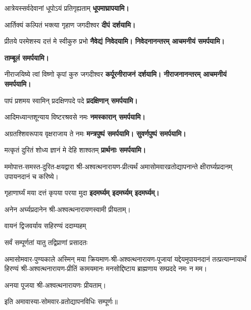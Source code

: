 \begin{center}

{आत्रेयस्सर्वदेवानां धूपोऽयं प्रतिगृह्यताम्}
\textbf{\devAya{} धूपमाघ्रापयामि।}
\medskip

{आर्तिक्यं कल्पितं भक्त्या गृहाण जगदीश्वर}
\textbf{\devAya{} दीपं दर्शयामि।}
\medskip

{प्रीतये परमेशस्य दत्तं मे स्वीकुरु प्रभो}
\textbf{\devAya{} नैवेद्यं निवेदयामि। निवेदनानन्तरम् आचमनीयं समर्पयामि।}
\medskip

\textbf{\devAya{} ताम्बूलं समर्पयामि।}
\medskip

{नीराजयिष्ये त्वां विष्णो कृपां कुरु जगदीश्वर}
\textbf{\devAya{} कर्पूरनीराजनं दर्शयामि। नीराजनानन्तरम् आचमनीयं समर्पयामि।}
\medskip

{पापं प्रशमय स्वामिन् प्रदक्षिणपदे पदे}
\textbf{\devAya{} प्रदक्षिणान् समर्पयामि।}
\medskip

{आदिमध्यान्तशून्याय विष्टरश्रवसे नमः}
\textbf{\devAya{} नमस्कारान् समर्पयामि।}
\medskip

{अग्रतश्शिवरूपाय वृक्षराजाय ते नमः}
\textbf{\devAya{} मन्त्रपुष्पं समर्पयामि। सुवर्णपुष्पं समर्पयामि।}
\medskip

{मत्कृतं दुरितं शोध्य ज्ञानं मे देहि शाश्वतम्}
\textbf{प्रार्थनाः समर्पयामि।}
\medskip

\resetShloka
ममोपात्त-समस्त-दुरित-क्षयद्वारा श्री-अश्वत्थनारायण-प्रीत्यर्थं
अमासोमवारव्रतोद्यापनान्ते क्षीरार्घ्यप्रदानम् उपायनदानं च करिष्ये।

{गृहाणार्घ्यं मया दत्तं कृपया परया मुदा}
\textbf{\devAya{} इदमर्घ्यम् इदमर्घ्यम् इदमर्घ्यम्।}

अनेन अर्घ्यप्रदानेन श्री-अश्वत्थनारायणस्वामी प्रीयताम्।


{वायनं द्विजवर्याय सहिरण्यं ददाम्यहम्}

{सर्वं सम्पूर्णतां यातु तद्विप्राणां प्रसादतः}

\hiranyagarbha

अमासोमवार-पुण्यकाले अस्मिन् मया क्रियमाण-श्री-अश्वत्थनारायण-पूजायां
यद्देयमुपायनदानं तत्प्रत्याम्नायार्थं हिरण्यं श्री-अश्वत्थनारायण-प्रीतिं
कामयमानः मनसोद्दिष्टाय ब्राह्मणाय सम्प्रददे नमः न मम।

अनया पूजया श्री-अश्वत्थनारायणः प्रीयताम्।

इति अमावास्या-सोमवार-व्रतोद्यापनविधिः सम्पूर्णः॥

\end{center}

